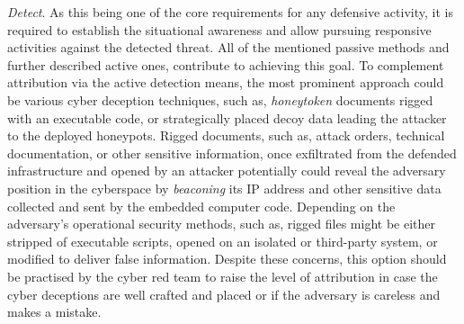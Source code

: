 \textit{Detect}. As this being one of the core requirements for any defensive activity, it is required to establish the situational awareness and allow pursuing responsive activities against the detected threat. All of the mentioned passive methods and further described active ones, contribute to achieving this goal. To complement attribution via the active detection means, the most prominent approach could be various cyber deception techniques, such as, \textit{honeytoken} documents rigged with an executable code, or strategically placed decoy data leading the attacker to the deployed honeypots. Rigged documents, such as, attack orders, technical documentation, or other sensitive information, once exfiltrated from the defended infrastructure and opened by an attacker potentially could reveal the adversary position in the cyberspace by \textit{beaconing} its IP address and other sensitive data collected and sent by the embedded computer code. Depending on the adversary's operational security methods, such as, rigged files might be either stripped of executable scripts, opened on an isolated or third-party system, or modified to deliver false information. Despite these concerns, this option should be practised by the cyber red team to raise the level of attribution in case the cyber deceptions are well crafted and placed or if the adversary is careless and makes a mistake.

